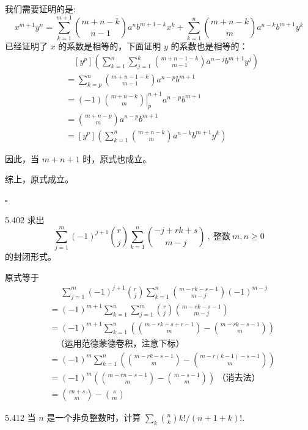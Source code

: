 \begin{enumerate}
    我们需要证明的是:
    \[
      x^{m+1} y^n = \sum_{k=1}^{m+1} \binom{m+n-k}{n-1} a^n b^{m+1-k} x^k + \sum_{k=1}^n \binom{m+n-k}{m} a^{n-k} b^{m+1} y^k
    \]
    已经证明了 \( x \) 的系数是相等的，下面证明 \( y \) 的系数也是相等的：
    \begin{align*}
      & \quad [y^p] \left( \sum_{k=1}^n \sum_{j=1}^k \binom{m+n-1-k}{m-1} a^{n-j} b^{m+1} y^j \right) \\
      &= \sum_{k=p}^n \binom{m+n-1-k}{m-1} a^{n-p} b^{m+1} \\
      &= (-1) \left. \binom{m+n-k}{m} \right|_p^{n+1} a^{n-p} b^{m+1} \\
      &= \binom{m+n-p}{m} a^{n-p} b^{m+1} \\
      &= [y^p] \left( \sum_{k=1}^n \binom{m+n-k}{m} a^{n-k} b^{m+1} y^k \right)
    \end{align*}

    因此，当 \( m+n+1 \) 时，原式也成立。
\end{enumerate}

综上，原式成立。

\hfill \( \square \)

\begin{problem}{5.40}{2}
  求出
  \[
    \sum_{j = 1}^m (-1)^{j+1} \binom{r}{j} \sum_{k=1}^n \binom{-j+rk+s}{m-j} \ , \ \text{整数} \ m, n \ge 0
  \]
  的封闭形式。
\end{problem}

原式等于
\begin{align*}
  &\phantom{=} \sum_{j = 1}^m (-1)^{j+1} \binom{r}{j} \sum_{k=1}^n \binom{m-rk-s-1}{m-j} (-1)^{m-j} \\
  &= (-1)^{m+1} \sum_{k=1}^n \sum_{j=1}^m \binom{r}{j} \binom{m-rk-s-1}{m-j} \\
  &= (-1)^{m+1} \sum_{k=1}^n \left( \binom{m-rk-s+r-1}{m} - \binom{m-rk-s-1}{m} \right) \\
  &\phantom{=} \text{（运用范德蒙德卷积，注意下标）} \\
  &= (-1)^{m} \sum_{k=1}^n \left( \binom{m-rk-s-1}{m} - \binom{m-r(k-1)-s-1}{m} \right) \\
  &= (-1)^m \left(\binom{m-rn-s-1}{m} - \binom{m-s-1}{m} \right) \ \text{（消去法）} \\
  &= \binom{rn+s}{m} - \binom{s}{m}
\end{align*}

\begin{problem}{5.41}{2}
  当 \( n \) 是一个非负整数时，计算 \( \sum_k \binom{n}{k} k! / (n+1+k)! \).
\end{problem}

